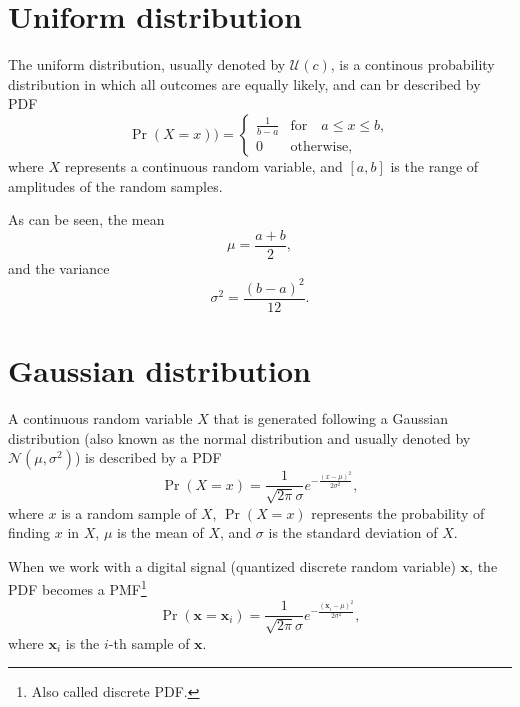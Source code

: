 
\section{Uniform distribution}

The uniform distribution, usually denoted by $\mathcal{U}(c)$, is a
continous probability distribution in which all outcomes are equally
likely, and can br described by \gls{PDF}
\begin{equation}
  \Pr(X{=}x)) =
  \begin{cases}
    \frac{1}{b-a} & \text{for}\quad a \le x \le b, \\
    0 & \text{otherwise},
  \end{cases}
\end{equation}
where $X$ represents a continuous random variable, and $[a, b]$ is the
range of amplitudes of the random samples.

As can be seen, the mean
\begin{equation}
  \mu = \frac{a+b}{2},
\end{equation}
and the variance
\begin{equation}
  \sigma^2 = \frac{(b-a)^{2}}{12}.
\end{equation}

\section{Gaussian distribution}
\label{sec:gaussian_distribution}

A continuous random variable $X$ that is generated following a Gaussian
distribution (also known as the normal distribution and usually denoted
by $\mathcal{N}(\mu, \sigma^2)$) is described by a \gls{PDF}
\begin{equation}
  \Pr(X{=}x) = \frac{1}{\sqrt{2\pi}\sigma} e^{-\frac{(x-\mu)^2}{2\sigma^2} },
  \label{eq:normal_PDF}
\end{equation}
where $x$ is a random sample of $X$, $\Pr(X{=}x)$ represents the
probability of finding $x$ in $X$, $\mu$ is the mean of $X$, and
$\sigma$ is the standard deviation of $X$.

When we work with a digital signal (quantized discrete random
variable) $\mathbf{x}$, the \gls{PDF} becomes a
\gls{PMF}\footnote{Also called discrete \gls{PDF}.}
\begin{equation}
  \Pr(\mathbf{x}{=}\mathbf{x}_i) = \frac{1}{\sqrt{2\pi}\sigma} e^{-\frac{(\mathbf{x}_i-\mu)^2}{2\sigma^2} },
  \label{eq:normal_PMD}
\end{equation}
where $\mathbf{x}_i$ is the $i$-th sample of $\mathbf{x}$.


